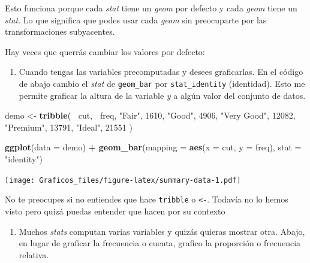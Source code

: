 \documentclass[]{book}
\newenvironment{Shaded}{\begin{snugshade}}{\end{snugshade}}
\newcommand{\DataTypeTok}[1]{\textcolor[rgb]{0.13,0.29,0.53}{#1}}
\newcommand{\DecValTok}[1]{\textcolor[rgb]{0.00,0.00,0.81}{#1}}
\newcommand{\KeywordTok}[1]{\textcolor[rgb]{0.13,0.29,0.53}{\textbf{#1}}}
\newcommand{\NormalTok}[1]{#1}
\newcommand{\OperatorTok}[1]{\textcolor[rgb]{0.81,0.36,0.00}{\textbf{#1}}}
\newcommand{\StringTok}[1]{\textcolor[rgb]{0.31,0.60,0.02}{#1}}
\providecommand{\tightlist}{%
  \setlength{\itemsep}{0pt}\setlength{\parskip}{0pt}}
\theoremstyle{definition}
\theoremstyle{definition}
\theoremstyle{definition}
\theoremstyle{remark}
\begin{document}
Esto funciona porque cada \emph{stat} tiene un \emph{geom} por defecto y
cada \emph{geom} tiene un \emph{stat}. Lo que significa que podes usar
cada \emph{geom} sin preocuparte por las transformaciones subyacentes.

Hay veces que querrás cambiar los valores por defecto:

\begin{enumerate}
\def\labelenumi{\arabic{enumi}.}
\tightlist
\item
  Cuando tengas las variables precomputadas y desees graficarlas. En el
  código de abajo cambio el \emph{stat} de \texttt{geom\_bar} por
  \texttt{stat\_identity} (identidad). Esto me permite graficar la
  altura de la variable \emph{y} a algún valor del conjunto de datos.
\end{enumerate}

\begin{Shaded}
\begin{Highlighting}[]
\NormalTok{demo <-}\StringTok{ }\KeywordTok{tribble}\NormalTok{(}
  \OperatorTok{~}\NormalTok{cut,         }\OperatorTok{~}\NormalTok{freq,}
  \StringTok{"Fair"}\NormalTok{,       }\DecValTok{1610}\NormalTok{,}
  \StringTok{"Good"}\NormalTok{,       }\DecValTok{4906}\NormalTok{,}
  \StringTok{"Very Good"}\NormalTok{,  }\DecValTok{12082}\NormalTok{,}
  \StringTok{"Premium"}\NormalTok{,    }\DecValTok{13791}\NormalTok{,}
  \StringTok{"Ideal"}\NormalTok{,      }\DecValTok{21551}
\NormalTok{)}

\KeywordTok{ggplot}\NormalTok{(}\DataTypeTok{data =}\NormalTok{ demo) }\OperatorTok{+}
\StringTok{  }\KeywordTok{geom_bar}\NormalTok{(}\DataTypeTok{mapping =} \KeywordTok{aes}\NormalTok{(}\DataTypeTok{x =}\NormalTok{ cut, }\DataTypeTok{y =}\NormalTok{ freq), }\DataTypeTok{stat =} \StringTok{"identity"}\NormalTok{)}
\end{Highlighting}
\end{Shaded}

\texttt{[image: Graficos\_files/figure-latex/summary-data-1.pdf]}

No te preocupes si no entiendes que hace \texttt{tribble} o
\texttt{\textless{}-}. Todavía no lo hemos visto pero quizá puedas
entender que hacen por su contexto

\begin{enumerate}
\def\labelenumi{\arabic{enumi}.}
\setcounter{enumi}{1}
\tightlist
\item
  Muchos \emph{stats} computan varias variables y quizás quieras mostrar
  otra. Abajo, en lugar de graficar la frecuencia o cuenta, grafico la
  proporción o frecuencia relativa.
\end{enumerate}
\end{document}
